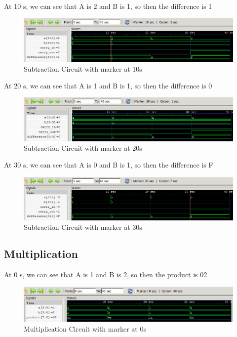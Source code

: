 \documentclass[12pt]{article}
\begin{document}
At 10 s, we can see that A is 2 and B is 1, so then the difference is 1
\begin{figure}[h]
    \centering
    \includegraphics[width = 1.0\textwidth]{figs/Sub10.png}
    \caption{Subtraction Circuit with marker at 10s}
    \label{fig:enter-label}
\end{figure}

\newpage

At 20 s, we can see that A is 1 and B is 1, so then the difference is 0
\begin{figure}[h]
    \centering
    \includegraphics[width = 1.0\textwidth]{figs/Sub20.png}
    \caption{Subtraction Circuit with marker at 20s}
    \label{fig:enter-label}
\end{figure}

At 30 s, we can see that A is 0 and B is 1, so then the difference is F
\begin{figure}[h]
    \centering
    \includegraphics[width = 1.0\textwidth]{figs/Sub30.png}
    \caption{Subtraction Circuit with marker at 30s}
    \label{fig:enter-label}
\end{figure}



\subsection{Multiplication}

At 0 s, we can see that A is 1 and B is 2, so then the product is 02
\begin{figure}[h]
    \centering
    \includegraphics[width = 1.0\textwidth]{figs/Mult0.png}
    \caption{Multiplication Circuit with marker at 0s}
    \label{fig:enter-label}
\end{figure}
\end{document}
